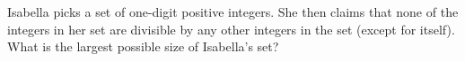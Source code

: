 Isabella picks a set of one-digit positive integers. She then claims that none of the integers in her set are divisible by any other integers in the set (except for itself). What is the largest possible size of Isabella's set?
